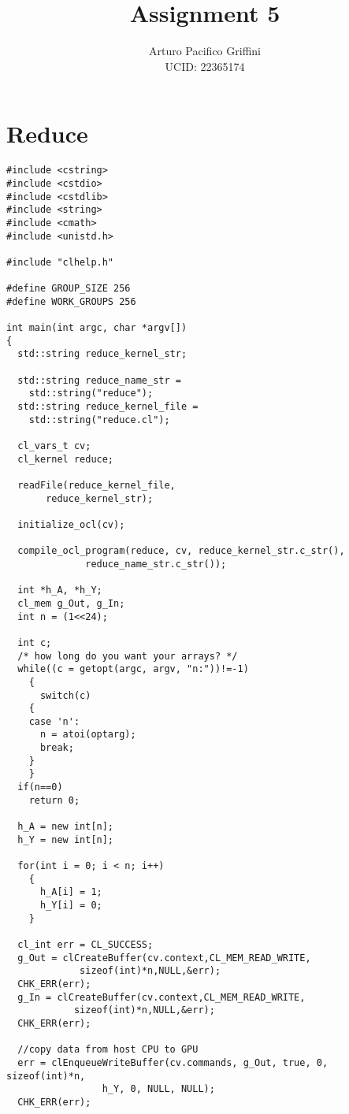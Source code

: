 \documentclass[11pt,letter]{article}
\title{Assignment 5}
\author{Arturo Pacifico Griffini\\
  UCID: 22365174}
\date{}
\begin{document}
%

\pagebreak



\section{Reduce}

\begin{lstlisting}[label=some-code,caption=reduce.cpp]
#include <cstring>
#include <cstdio>
#include <cstdlib>
#include <string>
#include <cmath>
#include <unistd.h>

#include "clhelp.h"

#define GROUP_SIZE 256
#define WORK_GROUPS 256

int main(int argc, char *argv[])
{
  std::string reduce_kernel_str;

  std::string reduce_name_str =
    std::string("reduce");
  std::string reduce_kernel_file =
    std::string("reduce.cl");

  cl_vars_t cv;
  cl_kernel reduce;

  readFile(reduce_kernel_file,
	   reduce_kernel_str);

  initialize_ocl(cv);

  compile_ocl_program(reduce, cv, reduce_kernel_str.c_str(),
		      reduce_name_str.c_str());

  int *h_A, *h_Y;
  cl_mem g_Out, g_In;
  int n = (1<<24);

  int c;
  /* how long do you want your arrays? */
  while((c = getopt(argc, argv, "n:"))!=-1)
    {
      switch(c)
	{
	case 'n':
	  n = atoi(optarg);
	  break;
	}
    }
  if(n==0)
    return 0;

  h_A = new int[n];
  h_Y = new int[n];

  for(int i = 0; i < n; i++)
    {
      h_A[i] = 1;
      h_Y[i] = 0;
    }

  cl_int err = CL_SUCCESS;
  g_Out = clCreateBuffer(cv.context,CL_MEM_READ_WRITE,
			 sizeof(int)*n,NULL,&err);
  CHK_ERR(err);
  g_In = clCreateBuffer(cv.context,CL_MEM_READ_WRITE,
			sizeof(int)*n,NULL,&err);
  CHK_ERR(err);

  //copy data from host CPU to GPU
  err = clEnqueueWriteBuffer(cv.commands, g_Out, true, 0, sizeof(int)*n,
			     h_Y, 0, NULL, NULL);
  CHK_ERR(err);



\end{lstlisting}
\end{document}
